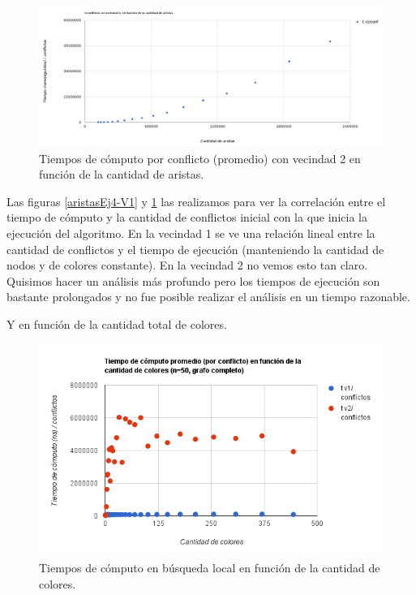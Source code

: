  \begin{figure}[H]
	\centering
 	\includegraphics[width=18cm]{imagenes/Ej4/tiempoPorConflictovsAristasV2.png}
	\caption{Tiempos de cómputo por conflicto (promedio) con vecindad 2 en función de la cantidad de aristas.}
	\label{aristasEj4-V2}
 \end{figure}
 
 Las figuras \ref{aristasEj4-V1} y \ref{aristasEj4-V2} las realizamos para ver la correlación entre el tiempo de cómputo y la cantidad de conflictos inicial con la que inicia la ejecución del algoritmo. En la vecindad 1 se ve una relación lineal entre la cantidad de conflictos y el tiempo de ejecución (manteniendo la cantidad de nodos y de colores constante). En la vecindad 2 no vemos esto tan claro. Quisimos hacer un análisis más profundo pero los tiempos de ejecución son bastante prolongados y no fue posible realizar el análisis en un tiempo razonable.
 

 
 Y en función de la cantidad total de colores.
 
  \begin{figure}[H]
	\centering
 	\includegraphics[width=18cm]{imagenes/Ej4/TvsColores.png}
	\caption{Tiempos de cómputo en búsqueda local en función de la cantidad de colores.}
	\label{coloresEj4-2}
 \end{figure}
 
